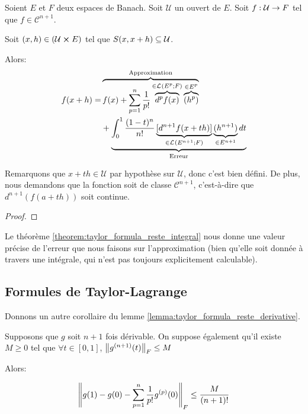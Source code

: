 \begin{theorem} 
	\label{theorem:taylor_formula_reste_integral}
	Soient $E$ et $F$ deux espaces de Banach. Soit $\mathcal{U}$ un ouvert de
	$E$.
	Soit $f : \mathcal{U} \rightarrow F$ tel que $f \in \mathcal{C}^{n + 1}$.

	Soit $(x, h) \in (\mathcal{U} \cross E)$ tel que $S(x, x + h)
	\subseteq \mathcal{U}$.

	Alors:
	\begin{align*}
		f(x + h) = & \overbrace
		{
			f(x) + \displaystyle \sum_{p = 1}^{n} \frac{1}{p!}
			\overbrace{d^{p}f(x)}^{\in \mathcal{L}_{}(E^{p}; F)}
			\overbrace{(h^{p})}^{\in E^{p}}
		}^{\text{Approximation}} \\
		& + \underbrace
		{
			\int_{0}^{1} \frac{(1 - t)^{n}}{n!} \underbrace{[d^{n + 1}f(x +
			th)]}_{\in \mathcal{L}_{}(E^{n+1}; F)} \underbrace{(h^{n+1})}_{\in E^{n +
			1}} dt
		}_{\text{Erreur}}
	\end{align*}

	Remarquons que $x + th \in \mathcal{U}$ par hypothèse sur $\mathcal{U}$,
	donc c'est bien défini. De plus, nous demandons que la fonction soit de
	classe $\mathcal{C}^{n + 1}$, c'est-à-dire que $d^{n + 1}(f(a + th))$ soit
	continue.
\end{theorem}

\ifdefined\outputproof
\begin{proof}

\end{proof}
\fi

Le théorème \ref{theorem:taylor_formula_reste_integral} nous donne une valeur
précise de l'erreur que nous faisons sur l'approximation (bien qu'elle soit
donnée à travers une intégrale, qui n'est pas toujours explicitement
calculable).

\subsection{Formules de Taylor-Lagrange}

Donnons un autre corollaire du lemme
\ref{lemma:taylor_formula_reste_derivative}.

\begin{corollary}
	Supposons que $g$ soit $n + 1$ fois dérivable.
	On suppose également qu'il existe $M \geq 0$ tel que $\forall t \in [0, 1]$,
	$\norm{g^{(n + 1)}(t)}_{F} \leq M$

	Alors:

	\begin{equation*}
		\norm{g(1) - g(0) - \displaystyle \sum_{p = 1}^{n} \frac{1}{p!}
		g^{(p)}(0)}_{F} \leq \frac{M}{(n + 1)!}
	\end{equation*}
\end{corollary}

